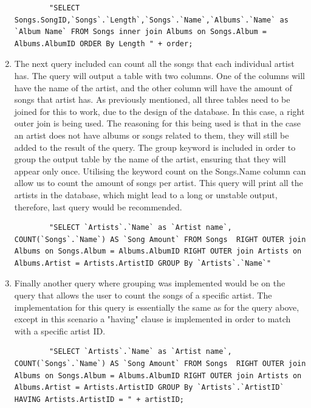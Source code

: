 \documentclass[a4paper,12pt]{article}
\begin{document}
\begin{enumerate}
	\begin{lstlisting}
		"SELECT Songs.SongID,`Songs`.`Length`,`Songs`.`Name`,`Albums`.`Name` as `Album Name` FROM Songs inner join Albums on Songs.Album = Albums.AlbumID ORDER By Length " + order;
	\end{lstlisting}
	
	\item The next query included can count all the songs that each individual artist has. The query will output a table with two columns. One of the columns will have the name of the artist, and the other column will have the amount of songs that artist has. As previously mentioned, all three tables need to be joined for this to work, due to the design of the database. In this case, a right outer join is being used. The reasoning for this being used is that in the case an artist does not have albums or songs related to them, they will still be added to the result of the query. The group keyword is included in order to group the output table by the name of the artist, ensuring that they will appear only once. Utilising the keyword count on the Songs.Name column can allow us to count the amount of songs per artist. This query will print all the artists in the database, which might lead to a long or unstable output, therefore, last query would be recommended.
	
	\begin{lstlisting}
		"SELECT `Artists`.`Name` as `Artist name`, COUNT(`Songs`.`Name`) AS `Song Amount` FROM Songs  RIGHT OUTER join Albums on Songs.Album = Albums.AlbumID RIGHT OUTER join Artists on Albums.Artist = Artists.ArtistID GROUP By `Artists`.`Name`"
	\end{lstlisting}
	
	\item Finally another query where grouping was implemented would be on the query that allows the user to count the songs of a specific artist. The implementation for this query is essentially the same as for the query above, except in this scenario a "having" clause is implemented in order to match with a specific artist ID.
	
	\begin{lstlisting}
		"SELECT `Artists`.`Name` as `Artist name`, COUNT(`Songs`.`Name`) AS `Song Amount` FROM Songs  RIGHT OUTER join Albums on Songs.Album = Albums.AlbumID RIGHT OUTER join Artists on Albums.Artist = Artists.ArtistID GROUP By `Artists`.`ArtistID` HAVING Artists.ArtistID = " + artistID;
	\end{lstlisting}
\end{enumerate}
\end{document}
